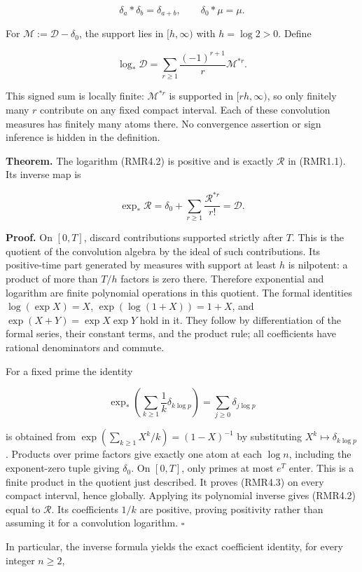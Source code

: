 \[
\delta_a*\delta_b=\delta_{a+b},\qquad \delta_0*\mu=\mu.
\tag{RMR4.1}
\]

For \(\mathcal M:=\mathcal D-\delta_0\), the support lies in
\([h,\infty)\) with \(h=\log2>0\). Define

\[
\log_*\mathcal D
=\sum_{r\ge1}\frac{(-1)^{r+1}}r\mathcal M^{*r}.
\tag{RMR4.2}
\]

This signed sum is locally finite: \(\mathcal M^{*r}\) is supported in
\([rh,\infty)\), so only finitely many \(r\) contribute on any fixed
compact interval. Each of these convolution measures has finitely many
atoms there. No convergence assertion or sign inference is hidden in the
definition.

\textbf{Theorem.} The logarithm (RMR4.2) is positive and is exactly
\(\mathcal R\) in (RMR1.1). Its inverse map is

\[
\exp_*\mathcal R
=\delta_0+\sum_{r\ge1}\frac{\mathcal R^{*r}}{r!}
=\mathcal D.
\tag{RMR4.3}
\]

\textbf{Proof.} On \([0,T]\), discard contributions supported strictly
after \(T\). This is the quotient of the convolution algebra by the
ideal of such contributions. Its positive-time part generated by
measures with support at least \(h\) is nilpotent: a product of more
than \(T/h\) factors is zero there. Therefore exponential and logarithm
are finite polynomial operations in this quotient. The formal identities
\(\log(\exp X)=X\), \(\exp(\log(1+X))=1+X\), and
\(\exp(X+Y)=\exp X\exp Y\) hold in it. They follow by differentiation of
the formal series, their constant terms, and the product rule; all
coefficients have rational denominators and commute.

For a fixed prime the identity

\[
\exp_*\left(\sum_{k\ge1}\frac1k\delta_{k\log p}\right)
=\sum_{j\ge0}\delta_{j\log p}
\tag{RMR4.4}
\]

is obtained from \(\exp(\sum_{k\ge1}X^k/k)=(1-X)^{-1}\) by substituting
\(X^k\mapsto\delta_{k\log p}\). Products over prime factors give exactly
one atom at each \(\log n\), including the exponent-zero tuple giving
\(\delta_0\). On \([0,T]\), only primes at most \(e^T\) enter. This is a
finite product in the quotient just described. It proves (RMR4.3) on
every compact interval, hence globally. Applying its polynomial inverse
gives (RMR4.2) equal to \(\mathcal R\). Its coefficients \(1/k\) are
positive, proving positivity rather than assuming it for a convolution
logarithm. \(\square\)

In particular, the inverse formula yields the exact coefficient
identity, for every integer \(n\ge2\),

